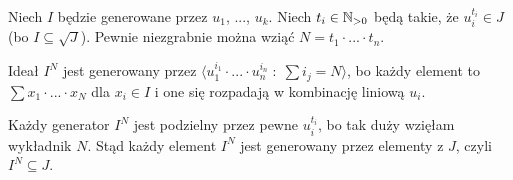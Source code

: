 \documentclass{article}
\begin{document}
Niech $I$ będzie generowane przez $u_1$, ..., $u_k$. Niech $t_i\in\mathbb{N}_{>0}$ będą takie, że $u_i^{t_i}\in J$ (bo $I\subseteq \sqrt{J}$). Pewnie niezgrabnie można wziąć $N=t_1\cdot...\cdot t_n$.

Ideał $I^N$ jest generowany przez $\langle u_1^{i_1}\cdot...\cdot u_n^{i_n}\;:\;\sum i_j=N\rangle$, bo każdy element to $\sum x_1\cdot...\cdot x_N$ dla $x_i\in I$ i one się rozpadają w kombinację liniową $u_i$.

Każdy generator $I^N$ jest podzielny przez pewne $u_i^{t_i}$, bo tak duży wzięłam wykładnik $N$. Stąd każdy element $I^N$ jest generowany przez elementy z $J$, czyli $I^N\subseteq J$.

\end{document}
